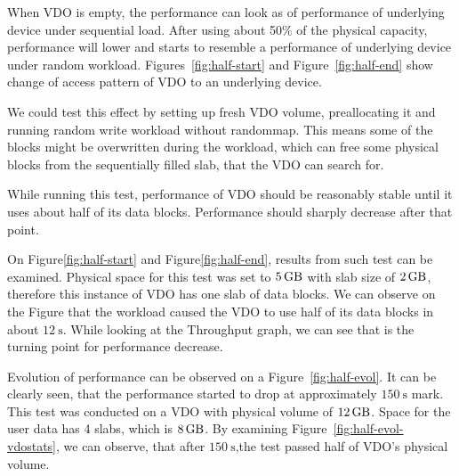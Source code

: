 \documentclass[
  color, %
  table, %
  lof,   %
  lot,   %
]{fithesis3}
\begin{document}
When VDO is empty, the performance can look as of performance of underlying device under sequential load. After using about 50\% of the physical capacity, performance will lower and starts to resemble a performance of underlying device under random workload. Figures~\ref{fig:half-start} and Figure~\ref{fig:half-end} show change of access pattern of VDO to an underlying device.

We could test this effect by setting up fresh VDO volume, preallocating it and running random write workload without randommap. This means some of the blocks might be overwritten during the workload, which can free some physical blocks from the sequentially filled slab, that the VDO can search for.

While running this test, performance of VDO should be reasonably stable until it uses about half of its data blocks. Performance should sharply decrease after that point.

On Figure\ref{fig:half-start} and Figure\ref{fig:half-end}, results from such test can be examined. Physical space for this test was set to $\SI{5}{\giga\byte}$ with slab size of $\SI{2}{\giga\byte}$, therefore this instance of VDO has one slab of data blocks. We can observe on the Figure that the workload caused the VDO to use half of its data blocks in about $\SI{12}{\second}$. While looking at the Throughput graph, we can see that is the turning point for performance decrease.\footnotemark[1]

\clearpage
Evolution of performance can be observed on a Figure~\ref{fig:half-evol}. It can be clearly seen, that the performance started to drop at approximately $\SI{150}{\second}$ mark. This test was conducted on a VDO with physical volume of $\SI{12}{\giga\byte}$. Space for the user data has 4 slabs, which is $\SI{8}{\giga\byte}$. By examining Figure~\ref{fig:half-evol-vdostats}, we can observe, that after $\SI{150}{\second}$,the test passed half of VDO's physical volume.
\end{document}
